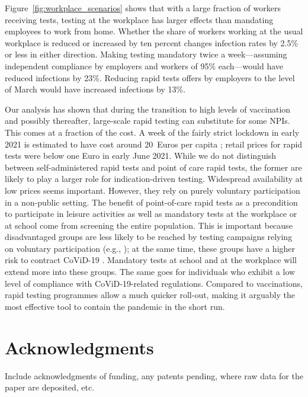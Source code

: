 \documentclass[12pt]{article}
\begin{document}
Figure~\ref{fig:workplace_scenarios} shows that with a large fraction of workers
receiving tests, testing at the workplace has larger effects than mandating employees to
work from home. Whether the share of workers working at the usual workplace is reduced
or increased by ten percent changes infection rates by 2.5\% or less in either
direction. Making testing mandatory twice a week---assuming independent compliance by
employers and workers of 95\% each---would have reduced infections by 23\%. Reducing
rapid tests offers by employers to the level of March would have increased infections by
13\%.

Our analysis has shown that during the transition to high levels of vaccination and
possibly thereafter, large-scale rapid testing can substitute for some NPIs. This comes
at a fraction of the cost. A week of the fairly strict lockdown in early 2021 is
estimated to have cost around 20~Euros per capita \cite{Wollmershauser2021}; retail
prices for rapid tests were below one Euro in early June 2021. While we do not
distinguish between self-administered rapid tests and point of care rapid tests, the
former are likely to play a larger role for indication-driven testing. Widespread
availability at low prices seems important. However, they rely on purely voluntary
participation in a non-public setting. The benefit of point-of-care rapid tests as a
precondition to participate in leisure activities as well as mandatory tests at the
workplace or at school come from screening the entire population. This is important
because disadvantaged groups are less likely to be reached by testing campaigns relying
on voluntary participation (e.g., \cite{StillmanTonin2021}); at
the same time, these groups have a higher risk to contract CoViD-19
\cite{KochInstitut2021a}. Mandatory tests at school and at the workplace will extend
more into these groups. The same goes for individuals who exhibit a low level of
compliance with CoViD-19-related regulations. Compared to vaccinations, rapid testing
programmes allow a much quicker roll-out, making it arguably the most effective tool to
contain the pandemic in the short run.







\section*{Acknowledgments}
Include acknowledgments of funding, any patents pending, where raw data for the paper are deposited, etc.
\end{document}
